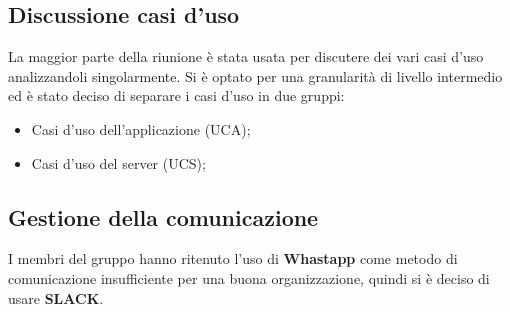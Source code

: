 \subsection{Discussione casi d'uso}
La maggior parte della riunione è stata usata per discutere dei vari casi d'uso analizzandoli singolarmente.
Si è optato per una granularità di livello intermedio ed è stato deciso di separare i casi d'uso in due gruppi:
\begin{itemize}
\item Casi d'uso dell'applicazione (UCA);
\item Casi d'uso del server (UCS);
\end{itemize}


\subsection{Gestione della comunicazione}
I membri del gruppo hanno ritenuto l'uso di \textbf{Whastapp} come metodo di comunicazione insufficiente per una buona organizzazione, quindi si è deciso di usare \textbf{SLACK}.

\clearpage